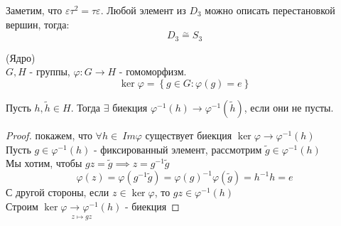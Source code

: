 \begin{examplelist}
\begin{center}
	\end{center}
	Заметим, что $\varepsilon\tau^2 = \tau\varepsilon$. Любой элемент из $D_3$ можно описать перестановкой вершин, тогда: 
	\[
	D_3 \overset{\sim}{=} S_3
	\]
\end{examplelist}

\begin{definition}(Ядро) \\
	$G, H$ - группы, $\varphi: G \to H$ - гомоморфизм.
	\[
	\ker\varphi = \left\{g \in G: \varphi(g) = e\right\}
	\]
\end{definition}

\begin{stmt}
	Пусть $h, \widetilde{h} \in H$. Тогда $\exists$ биекция $\varphi^{-1}(h) \to \varphi^{-1}(\widetilde{h})$, если они не пусты.
	\begin{proof}
		покажем, что $\forall h \in \ Im\varphi$ существует биекция $\ker\varphi \to \varphi^{-1}(h)$ \\
		Пусть $g \in \varphi^{-1}(h)$ - фиксированный элемент, рассмотрим $\widetilde{g} \in \varphi^{-1}(h)$ \\
		Мы хотим, чтобы $gz = \widetilde{g} \implies z = g^{-1}\widetilde{g}$
		\[
		\varphi(z) = \varphi(g^{-1}\widetilde{g}) = \varphi(g)^{-1} \varphi(\widetilde{g}) = h^{-1}h = e
		\]
		С другой стороны, если $z \in \ker \varphi$, то $gz \in \varphi^{-1}(h)$\\
		Строим $\underset{z \mapsto gz}{\ker\varphi \to \varphi^{-1}(h)}$ - биекция
	\end{proof}
\end{stmt}

